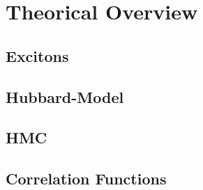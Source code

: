 
\chapter{Theorical Overview}
\label{sec:theory}

\section{Excitons}
\section{Hubbard-Model}
\section{HMC}
\section{Correlation Functions}

